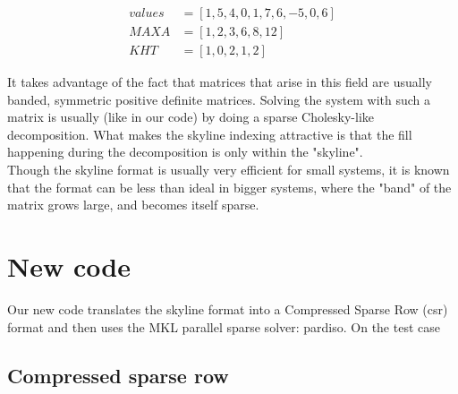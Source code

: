 \documentclass[11pt]{article}
\begin{document}
\begin{align}
values&=[1, 5, 4, 0, 1, 7, 6, -5, 0, 6]\\
MAXA&= [1, 2, 3, 6, 8, 12] \\
KHT&=[1, 0, 2, 1, 2]
\end{align}

 It takes advantage of the fact that matrices that arise in this field are usually banded, symmetric positive definite matrices. Solving the system with such a matrix is usually (like in our code) by doing a sparse Cholesky-like decomposition. What makes the skyline indexing attractive is that the fill happening during the decomposition is only within the "skyline".\\
 
Though the skyline format is usually very efficient for small systems, it is known that the format can be less than ideal in bigger systems, where the "band" of the matrix grows large, and becomes itself  sparse.

\section{New code}\label{sec:newCode}
Our new code translates the skyline format into a Compressed Sparse Row (csr) format and then uses the MKL parallel sparse solver: pardiso. On the test case 

\subsection{Compressed sparse row}
\end{document}
